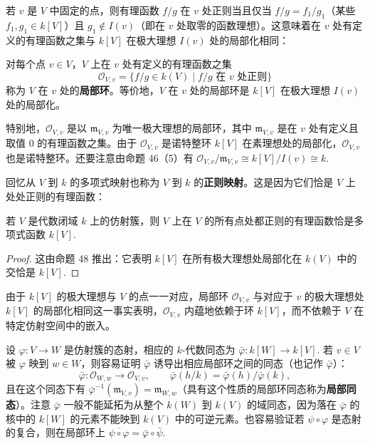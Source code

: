 若 \(v\) 是 \(V\) 中固定的点，则有理函数 \(f/g\) 在 \(v\) 处正则当且仅当 \(f/g = f_1/g_1\)（某些 \(f_1, g_1 \in k[V]\)）且 \(g_1 \notin I(v)\)（即在 \(v\) 处取零的函数理想）。这意味着在 \(v\) 处有定义的有理函数之集与 \(k[V]\) 在极大理想 \(I(v)\) 处的局部化相同：

\begin{definition}
对每个点 \(v \in V\)，\(V\) 上在 \(v\) 处有定义的有理函数之集
\[
\mathcal{O}_{V,v} = \{f/g \in k(V) \mid f/g \text{ 在 } v \text{ 处正则}\}
\]
称为 \(V\) 在 \(v\) 处的\textbf{局部环}。等价地，\(V\) 在 \(v\) 处的局部环是 \(k[V]\) 在极大理想 \(I(v)\) 处的局部化。
\end{definition}

特别地，\(\mathcal{O}_{V,v}\) 是以 \(\mathfrak{m}_{V,v}\) 为唯一极大理想的局部环，其中 \(\mathfrak{m}_{V,v}\) 是在 \(v\) 处有定义且取值 0 的有理函数之集。由于 \(\mathcal{O}_{V,v}\) 是诺特整环 \(k[V]\) 在素理想处的局部化，\(\mathcal{O}_{V,v}\) 也是诺特整环。还要注意由命题 46（5）有 \(\mathcal{O}_{V,v}/\mathfrak{m}_{V,v} \cong k[V]/I(v) \cong k\).

回忆从 \(V\) 到 \(k\) 的多项式映射也称为 \(V\) 到 \(k\) 的\textbf{正则映射}。这是因为它们恰是 \(V\) 上处处正则的有理函数：

\begin{proposition}\label{pro:15.51}
若 \(V\) 是代数闭域 \(k\) 上的仿射簇，则 \(V\) 上在 \(V\) 的所有点处都正则的有理函数恰是多项式函数 \(k[V]\).
\end{proposition}

\begin{proof}
这由命题 48 推出：它表明 \(k[V]\) 在所有极大理想处局部化在 \(k(V)\) 中的交恰是 \(k[V]\).
\end{proof}

由于 \(k[V]\) 的极大理想与 \(V\) 的点一一对应，局部环 \(\mathcal{O}_{V,v}\) 与对应于 \(v\) 的极大理想处 \(k[V]\) 的局部化相同这一事实表明，\(\mathcal{O}_{V,v}\) 内蕴地依赖于环 \(k[V]\)，而不依赖于 \(V\) 在特定仿射空间中的嵌入。

设 \(\varphi : V \to W\) 是仿射簇的态射，相应的 \(k\)-代数同态为 \(\bar\varphi : k[W] \to k[V]\). 若 \(v \in V\) 被 \(\varphi\) 映到 \(w \in W\)，则容易证明 \(\bar\varphi\) 诱导出相应局部环之间的同态（也记作 \(\bar\varphi\)）：
\[
\bar\varphi : \mathcal{O}_{W,w} \to \mathcal{O}_{V,v}, \qquad \bar\varphi(h/k) = \bar\varphi(h)/\bar\varphi(k),
\]
且在这个同态下有 \(\bar\varphi^{-1}(\mathfrak{m}_{V,v}) = \mathfrak{m}_{W,w}\)（具有这个性质的局部环同态称为\textbf{局部同态}）。注意 \(\bar\varphi\) 一般不能延拓为从整个 \(k(W)\) 到 \(k(V)\) 的域同态，因为落在 \(\bar\varphi\) 的核中的 \(k[W]\) 的元素不能映到 \(k(V)\) 中的可逆元素。也容易验证若 \(\psi \circ \varphi\) 是态射的复合，则在局部环上 \(\overline{\psi \circ \varphi} = \bar\varphi \circ \bar\psi\).

